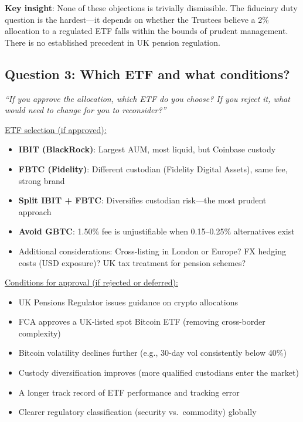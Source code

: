 \documentclass[11pt]{article}
\begin{document}
\medskip
\noindent\textbf{Key insight}: None of these objections is trivially dismissible. The fiduciary duty question is the hardest---it depends on whether the Trustees believe a 2\% allocation to a regulated ETF falls within the bounds of prudent management. There is no established precedent in UK pension regulation.

\subsection*{Question 3: Which ETF and what conditions?}

\textit{``If you approve the allocation, which ETF do you choose? If you reject it, what would need to change for you to reconsider?''}

\medskip
\noindent\underline{ETF selection (if approved):}
\begin{itemize}[leftmargin=*]
\item \textbf{IBIT (BlackRock)}: Largest AUM, most liquid, but Coinbase custody
\item \textbf{FBTC (Fidelity)}: Different custodian (Fidelity Digital Assets), same fee, strong brand
\item \textbf{Split IBIT + FBTC}: Diversifies custodian risk---the most prudent approach
\item \textbf{Avoid GBTC}: 1.50\% fee is unjustifiable when 0.15--0.25\% alternatives exist
\item Additional considerations: Cross-listing in London or Europe? FX hedging costs (USD exposure)? UK tax treatment for pension schemes?
\end{itemize}

\medskip
\noindent\underline{Conditions for approval (if rejected or deferred):}
\begin{itemize}[leftmargin=*]
\item UK Pensions Regulator issues guidance on crypto allocations
\item FCA approves a UK-listed spot Bitcoin ETF (removing cross-border complexity)
\item Bitcoin volatility declines further (e.g., 30-day vol consistently below 40\%)
\item Custody diversification improves (more qualified custodians enter the market)
\item A longer track record of ETF performance and tracking error
\item Clearer regulatory classification (security vs.\ commodity) globally
\end{itemize}
\end{document}
